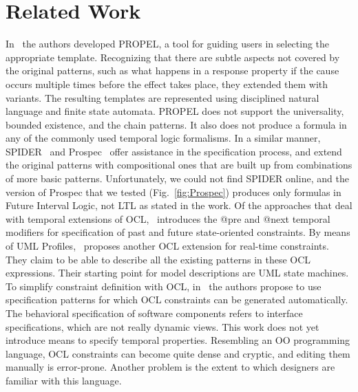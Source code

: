 \documentclass[letter]{llncs}
\begin{document}
\section{Related Work}
\label{sec:RelatedWork}
In~\cite{Smith02propel:an} the authors developed PROPEL, a tool for guiding users in 
selecting the appropriate template. Recognizing that there are subtle aspects
not covered by the original patterns, such as what happens in a response
property if the cause occurs multiple times before the effect takes place,
they extended them with variants. The resulting templates 
are represented using disciplined natural language and finite state automata. 
PROPEL does not support the universality, bounded existence, and the chain patterns. It also 
does not produce a formula in any of the commonly used temporal logic formalisms.
In a similar manner, SPIDER~\cite{konrad2005facilitating} and 
Prospec~\cite{Mondragon_prospec} offer assistance in the specification process, and extend the original patterns
with compositional ones that are built up from combinations of more basic patterns. 
Unfortunately, we could not find SPIDER online, and the version of Prospec that we tested (Fig.~\ref{fig:Prospec}) produces only 
formulas in Future Interval Logic, not LTL as stated in the work.
Of the approaches that deal with temporal extensions of OCL,~\cite{Ziemann02anextension}
introduces the @pre and @next temporal modifiers for specification of past and future state-oriented constraints. 
By means of UML Profiles,~\cite{Flake03formalsemantics}
proposes another OCL extension for real-time constraints. They claim to be able to describe all the existing 
patterns in these OCL expressions. Their starting point for model descriptions are UML state machines.
To simplify constraint definition with OCL, in~\cite{Ackermann:2006:LOS:2135315.2135339} the authors 
propose to use specification patterns for which OCL constraints can be generated automatically.
The behavioral specification of software components refers to interface specifications,
which are not really dynamic views. This work does not yet introduce means to specify temporal properties.
Resembling an OO programming language, OCL constraints can become quite dense and cryptic, and editing 
them manually is error-prone. Another problem is the extent to which designers are familiar with this language.
\end{document}
